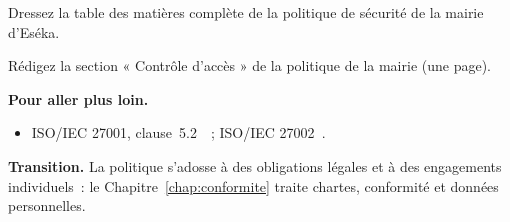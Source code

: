\begin{boxexo}[title={\ding{45}\quad Exercice~5.9. Table des matières \niveauexpert}]
Dressez la table des matières complète de la politique de sécurité de la mairie
d'Eséka.
\end{boxexo}

\begin{boxexo}[title={\ding{45}\quad Exercice~5.10. Section rédigée \niveauexpert}]
Rédigez la section « Contrôle d'accès » de la politique de la mairie (une
page).
\end{boxexo}

\bigskip

\begin{boxinfo}
\textbf{Pour aller plus loin.}
\begin{itemize}
    \item ISO/IEC 27001, clause~5.2~\cite{iso27001}~; ISO/IEC 27002~\cite{iso27002}.
\end{itemize}
\end{boxinfo}

\begin{boxinfo}
\textbf{Transition.} La politique s'adosse à des obligations légales et à des
engagements individuels~: le Chapitre~\ref{chap:conformite} traite chartes,
conformité et données personnelles.
\end{boxinfo}

